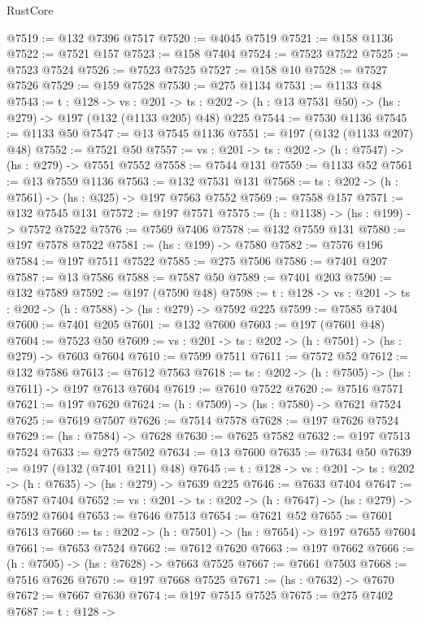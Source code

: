 \begin{lexlean}{RustCore}
\begin{coremodule}
@7519 := @132 @7396 @7517
@7520 := @4045 @7519
@7521 := @158 @1136
@7522 := @7521 @157
@7523 := @158 @7404
@7524 := @7523 @7522
@7525 := @7523 @7524
@7526 := @7523 @7525
@7527 := @158 @10
@7528 := @7527 @7526
@7529 := @159 @7528
@7530 := @275 @1134
@7531 := @1133 @48
@7543 := {t : @128} ->
  {vs : @201} ->
  {ts : @202} -> (h : @13 @7531 @50) -> (hs : @279) -> @197 (@132 (@1133 @205) @48) @225
@7544 := @7530 @1136
@7545 := @1133 @50
@7547 := @13 @7545 @1136
@7551 := @197 (@132 (@1133 @207) @48)
@7552 := @7521 @50
@7557 := {vs : @201} -> {ts : @202} -> (h : @7547) -> (hs : @279) -> @7551 @7552
@7558 := @7544 @131
@7559 := @1133 @52
@7561 := @13 @7559 @1136
@7563 := @132 @7531 @131
@7568 := {ts : @202} -> (h : @7561) -> (hs : @325) -> @197 @7563 @7552
@7569 := @7558 @157
@7571 := @132 @7545 @131
@7572 := @197 @7571
@7575 := (h : @1138) -> (hs : @199) -> @7572 @7522
@7576 := @7569 @7406
@7578 := @132 @7559 @131
@7580 := @197 @7578 @7522
@7581 := (hs : @199) -> @7580
@7582 := @7576 @196
@7584 := @197 @7511 @7522
@7585 := @275 @7506
@7586 := @7401 @207
@7587 := @13 @7586
@7588 := @7587 @50
@7589 := @7401 @203
@7590 := @132 @7589
@7592 := @197 (@7590 @48)
@7598 := {t : @128} -> {vs : @201} -> {ts : @202} -> (h : @7588) -> (hs : @279) -> @7592 @225
@7599 := @7585 @7404
@7600 := @7401 @205
@7601 := @132 @7600
@7603 := @197 (@7601 @48)
@7604 := @7523 @50
@7609 := {vs : @201} -> {ts : @202} -> (h : @7501) -> (hs : @279) -> @7603 @7604
@7610 := @7599 @7511
@7611 := @7572 @52
@7612 := @132 @7586
@7613 := @7612 @7563
@7618 := {ts : @202} -> (h : @7505) -> (hs : @7611) -> @197 @7613 @7604
@7619 := @7610 @7522
@7620 := @7516 @7571
@7621 := @197 @7620
@7624 := (h : @7509) -> (hs : @7580) -> @7621 @7524
@7625 := @7619 @7507
@7626 := @7514 @7578
@7628 := @197 @7626 @7524
@7629 := (hs : @7584) -> @7628
@7630 := @7625 @7582
@7632 := @197 @7513 @7524
@7633 := @275 @7502
@7634 := @13 @7600
@7635 := @7634 @50
@7639 := @197 (@132 (@7401 @211) @48)
@7645 := {t : @128} -> {vs : @201} -> {ts : @202} -> (h : @7635) -> (hs : @279) -> @7639 @225
@7646 := @7633 @7404
@7647 := @7587 @7404
@7652 := {vs : @201} -> {ts : @202} -> (h : @7647) -> (hs : @279) -> @7592 @7604
@7653 := @7646 @7513
@7654 := @7621 @52
@7655 := @7601 @7613
@7660 := {ts : @202} -> (h : @7501) -> (hs : @7654) -> @197 @7655 @7604
@7661 := @7653 @7524
@7662 := @7612 @7620
@7663 := @197 @7662
@7666 := (h : @7505) -> (hs : @7628) -> @7663 @7525
@7667 := @7661 @7503
@7668 := @7516 @7626
@7670 := @197 @7668 @7525
@7671 := (hs : @7632) -> @7670
@7672 := @7667 @7630
@7674 := @197 @7515 @7525
@7675 := @275 @7402
@7687 := {t : @128} ->

\end{coremodule}
\end{lexlean}
